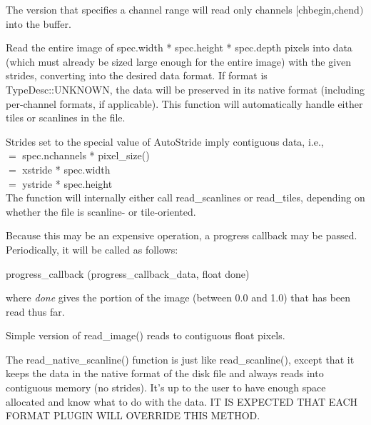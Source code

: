 The version that specifies a channel range will read only
channels $[${\cf chbegin},{\cf chend}$)$ into the buffer.
\apiend



Read the entire image of {\kw spec.width * spec.height * spec.depth}
pixels into data (which must already be sized large enough for
the entire image) with the given strides, converting into the desired
data format.  
If {\cf format} is {\cf TypeDesc::UNKNOWN}, the data will be preserved 
in its native format (including per-channel formats, if applicable).
This function will automatically handle either tiles or scanlines in
the file.

Strides set to the special value of {\kw AutoStride} imply contiguous
data, i.e., \\
 $=$ {\kw spec.nchannels * pixel_size()} \\
 $=$ {\kw xstride * spec.width} \\
 $=$ {\kw ystride * spec.height} \\
The function will internally either call {\kw read_scanlines} or 
{\kw read_tiles}, depending on whether the file is scanline- or
tile-oriented.

Because this may be an expensive operation, a progress callback may be passed.
Periodically, it will be called as follows:\\
\begin{code}
    progress_callback (progress_callback_data, float done)
\end{code}
\noindent where \emph{done} gives the portion of the image 
(between 0.0 and 1.0) that has been read thus far.
\apiend

Simple version of {\kw read_image()} reads to contiguous float pixels.
\apiend

The {\kw read_native_scanline()} function is just like {\kw
  read_scanline()}, except that it keeps the data in the native format
of the disk file and always reads into contiguous memory (no strides).
It's up to the user to have enough space allocated and know what to do
with the data.  IT IS EXPECTED THAT EACH FORMAT PLUGIN WILL OVERRIDE
THIS METHOD.
\apiend

